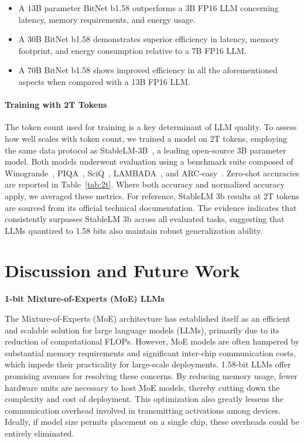 \begin{itemize}
    \item A 13B parameter BitNet b1.58 outperforms a 3B FP16 LLM concerning latency, memory requirements, and energy usage.
    \item A 30B BitNet b1.58 demonstrates superior efficiency in latency, memory footprint, and energy consumption relative to a 7B FP16 LLM.
    \item A 70B BitNet b1.58 shows improved efficiency in all the aforementioned aspects when compared with a 13B FP16 LLM.
\end{itemize}

\paragraph{Training with 2T Tokens}

The token count used for training is a key determinant of LLM quality. To assess how well  scales with token count, we trained a  model on 2T tokens, employing the same data protocol as StableLM-3B~\cite{StableLM-3B-4E1T}, a leading open-source 3B parameter model. Both models underwent evaluation using a benchmark suite composed of Winogrande~\cite{winoGrande}, PIQA~\cite{piqa}, SciQ~\cite{sciq}, LAMBADA~\cite{lambada}, and ARC-easy~\cite{arc}. Zero-shot accuracies are reported in Table~\ref{tab:2t}. Where both accuracy and normalized accuracy apply, we averaged these metrics. For reference, StableLM 3b results at 2T tokens are sourced from its official technical documentation. The evidence indicates that  consistently surpasses StableLM 3b across all evaluated tasks, suggesting that LLMs quantized to 1.58 bits also maintain robust generalization ability.

\section{Discussion and Future Work}

\textbf{1-bit Mixture-of-Experts (MoE) LLMs}

The Mixture-of-Experts (MoE) architecture has established itself as an efficient and scalable solution for large language models (LLMs), primarily due to its reduction of computational FLOPs. However, MoE models are often hampered by substantial memory requirements and significant inter-chip communication costs, which impede their practicality for large-scale deployments. 1.58-bit LLMs offer promising avenues for resolving these concerns. By reducing memory usage, fewer hardware units are necessary to host MoE models, thereby cutting down the complexity and cost of deployment. This optimization also greatly lessens the communication overhead involved in transmitting activations among devices. Ideally, if model size permits placement on a single chip, these overheads could be entirely eliminated.

